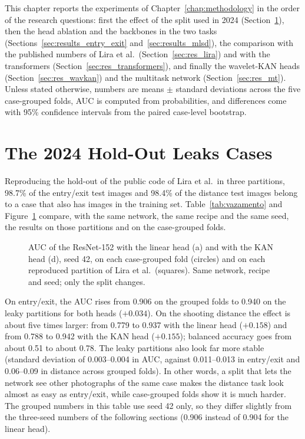 \label{chap:results}

This chapter reports the experiments of Chapter~\ref{chap:methodology} in the order of the research questions: first the effect of the split used in 2024 (Section~\ref{sec:res_leak}), then the head ablation and the backbones in the two tasks (Sections~\ref{sec:results_entry_exit} and~\ref{sec:results_mlsd}), the comparison with the published numbers of Lira et al.\ (Section~\ref{sec:res_lira}) and with the transformers (Section~\ref{sec:res_transformers}), and finally the wavelet-KAN heads (Section~\ref{sec:res_wavkan}) and the multitask network (Section~\ref{sec:res_mt}). Unless stated otherwise, numbers are means $\pm$ standard deviations across the five case-grouped folds, AUC is computed from probabilities, and differences come with 95\% confidence intervals from the paired case-level bootstrap.

\section{The 2024 Hold-Out Leaks Cases}
\label{sec:res_leak}

Reproducing the hold-out of the public code of Lira et al.\ in three partitions, 98.7\% of the entry/exit test images and 98.4\% of the distance test images belong to a case that also has images in the training set. Table~\ref{tab:vazamento} and Figure~\ref{fig:vazamento} compare, with the same network, the same recipe and the same seed, the results on those partitions and on the case-grouped folds.



\begin{figure}[!htbp]
\centering

\caption{AUC of the ResNet-152 with the linear head (a) and with the KAN head (d), seed 42, on each case-grouped fold (circles) and on each reproduced partition of Lira et al.\ (squares). Same network, recipe and seed; only the split changes.}
\label{fig:vazamento}
\end{figure}

On entry/exit, the AUC rises from 0.906 on the grouped folds to 0.940 on the leaky partitions for both heads ($+0.034$). On the shooting distance the effect is about five times larger: from 0.779 to 0.937 with the linear head ($+0.158$) and from 0.788 to 0.942 with the KAN head ($+0.155$); balanced accuracy goes from about 0.51 to about 0.78. The leaky partitions also look far more stable (standard deviation of 0.003--0.004 in AUC, against 0.011--0.013 in entry/exit and 0.06--0.09 in distance across grouped folds). In other words, a split that lets the network see other photographs of the same case makes the distance task look almost as easy as entry/exit, while case-grouped folds show it is much harder. The grouped numbers in this table use seed 42 only, so they differ slightly from the three-seed numbers of the following sections (0.906 instead of 0.904 for the linear head).

